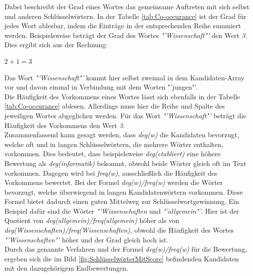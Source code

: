 			Dabei beschreibt der Grad eines Wortes das gemeinsame Auftreten mit sich selbst und anderen Schlüsselwörtern. In der Tabelle \ref{tab:Co-occurance} ist der Grad für jedes Wort ablesbar, indem die Einträge in der entsprechenden Reihe summiert werden. Beispielsweise beträgt der Grad des Wortes \textit{"'Wissenschaft"'} den Wert \textit{3}. Dies ergibt sich aus der Rechnung:
			\begin{center}
				$2 + 1 = 3$
			\end{center}
			Das Wort \textit{"'Wissenschaft"'} kommt hier selbst zweimal in dem Kandidaten-Array vor und davon einmal in Verbindung mit dem Worten "'jungen"'.\\
			Die Häufigkeit des Vorkommens eines Wortes lässt sich ebenfalls in der Tabelle \ref{tab:Co-occurance} ablesen. Allerdings muss hier die Reihe und Spalte des jeweiligen Wortes abgeglichen werden. Für das Wort \textit{"'Wissenschaft"'} beträgt die Häufigkeit des Vorkommens den Wert \textit{3}.\\
			Zusammenfassend kann gesagt werden, dass \textit{deg(w)} die Kandidaten bevorzugt, welche oft und in langen Schlüsselwörtern, die mehrere Wörter enthalten, vorkommen. Dies bedeutet, dass beispielsweise \textit{deg(etabliert)} eine höhere Bewertung als \textit{deg(informatik)} bekommt, obwohl beide Wörter gleich oft im Text vorkommen. Dagegen wird bei \textit{freq(w)}, ausschließlich die Häufigkeit des Vorkommens bewertet. Bei der Formel \textit{deg(w)/freq(w)} werden die Wörter bevorzugt, welche überwiegend in langen Kandidatenwörtern vorkommen. Diese Formel bietet dadurch einen guten Mittelweg zur Schlüsselwortgewinnung. Ein Beispiel dafür sind die Wörter \textit{"'Wissenschaften} und \textit{"'allgemein"'}. Hier ist der Quotient von \textit{deg(allgemein)/freq(allgemein)} höher als von \textit{deg(Wissenschaften)/freq(Wissenschaften)}, obwohl die Häufigkeit des Wortes \textit{"'Wissenschaften"'} höher und der Grad gleich hoch ist. \cite{rose2010automatic}\\
			Durch das genannte Verfahren und der Formel \textit{deg(w)/freq(w)} für die Bewertung, ergeben sich die im Bild \ref{fig:SchlüsselwörterMitScore} befindenden Kandidaten mit den dazugehörigem Endbewertungen. \cite{rose2010automatic}
			
